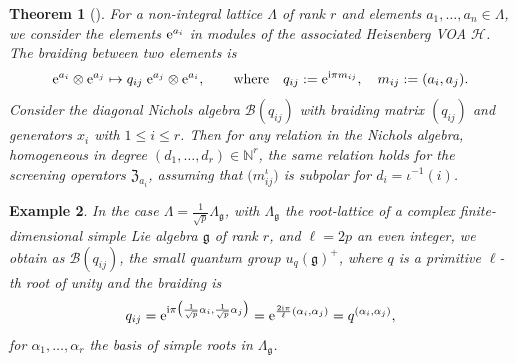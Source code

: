 \documentclass[10pt,a4paper]{amsart}
\numberwithin{equation}{section}
\newtheorem{teo}{Theorem}[section]
\newtheorem{ese}[teo]{Example}
\newcommand{\N}{\mathbb{N}}
\begin{document}
\begin{teo}[{\cite[Theorem 7.1]{Len17}}]\label{NArelations}
For a non-integral lattice $\Lambda$ of rank $r$ and elements $a_1, \dots, \allowbreak a_n \in \Lambda$, we consider the elements ${\rm e}^{a_i}$ in modules of the associated Heisenberg VOA $\mathcal{H}$. The braiding between two elements is
\[{\rm e}^{a_i} \otimes {\rm e}^{a_j} \mapsto q_{ij} \; {\rm e}^{a_j} \otimes {\rm e}^{a_i},\qquad
 \text{where} \quad q_{ij} := {\rm e}^{{\rm i} \pi m_{ij}}, \quad m_{ij}:=(a_i, a_j).\]
Consider the diagonal Nichols algebra $\mathcal{B}(q_{ij})$ with braiding matrix $(q_{ij})$ and generators $x_{i}$ with $1\leq i\leq r$. Then for any relation in the Nichols algebra, homogeneous in degree $(d_1, \dots, d_r) \in \N^r$, the same relation holds for the screening operators $\mathfrak{Z}_{a_i}$, assuming that $\big(m^\iota_{ij}\big)$ is subpolar for $d_i=\iota^{-1}(i)$.
\end{teo}

\begin{ese} In the case $\Lambda= \frac{1}{\sqrt{p}} \Lambda_\mathfrak{g}$, with $\Lambda_\mathfrak{g}$ the root-lattice of a complex finite-dimensional simple Lie algebra $\mathfrak{g}$ of rank $r$, and $\ell=2p$ an even integer, we obtain as $\mathcal{B}(q_{ij})$, the small quantum group $u_q(\mathfrak{g})^+$, where $q$ is a primitive $\ell$-th root of unity and the braiding is
\[ q_{ij} = {\rm e}^{{\rm i} \pi \big(\frac{1}{\sqrt{p}}\alpha_i, \frac{1}{\sqrt{p}}\alpha_j\big)} = {\rm e}^{\frac{2{\rm i} \pi}{\ell}(\alpha_i,\alpha_j)} = q^{(\alpha_i,\alpha_j)},\]
for $\alpha_1,\dots,\alpha_r$ the basis of simple roots in $\Lambda_\mathfrak{g}$.
\end{ese}
\end{document}
